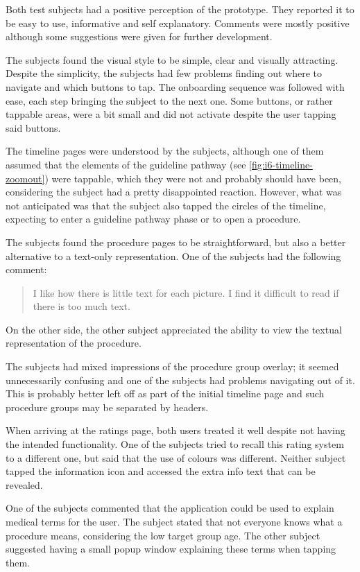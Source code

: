 Both test subjects had a positive perception of the prototype. They reported it to be easy to use, informative and self explanatory. Comments were mostly positive although some suggestions were given for further development.

The subjects found the visual style to be simple, clear and visually attracting. Despite the simplicity, the subjects had few problems finding out where to navigate and which buttons to tap. The onboarding sequence was followed with ease, each step bringing the subject to the next one. Some buttons, or rather tappable areas, were a bit small and did not activate despite the user tapping said buttons.

The timeline pages were understood by the subjects, although one of them assumed that the elements of the guideline pathway (see \autoref{fig:i6-timeline-zoomout}) were tappable, which they were not and probably should have been, considering the subject had a pretty disappointed reaction. However, what was not anticipated was that the subject also tapped the circles of the timeline, expecting to enter a guideline pathway phase or to open a procedure.

The subjects found the procedure pages to be straightforward, but also a better alternative to a text-only representation. One of the subjects had the following comment:

\begin{quote}
    I like how there is little text for each picture. I find it difficult to read if there is too much text.
\end{quote}

On the other side, the other subject appreciated the ability to view the textual representation of the procedure.

The subjects had mixed impressions of the procedure group overlay; it seemed unnecessarily confusing and one of the subjects had problems navigating out of it. This is probably better left off as part of the initial timeline page and such procedure groups may be separated by headers.

When arriving at the ratings page, both users treated it well despite not having the intended functionality. One of the subjects tried to recall this rating system to a different one, but said that the use of colours was different. Neither subject tapped the information icon and accessed the extra info text that can be revealed.

One of the subjects commented that the application could be used to explain medical terms for the user. The subject stated that not everyone knows what a procedure means, considering the low target group age. The other subject suggested having a small popup window explaining these terms when tapping them.

